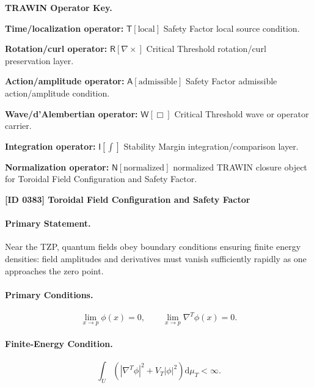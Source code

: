 \par\vspace{0.45\baselineskip}
\noindent\begin{minipage}[t]{\linewidth}
\begingroup
\small
\raggedright
\textbf{TRAWIN Operator Key.}\par
\noindent\textbf{Time/localization operator:} $\mathsf{T}\!\left[\mathrm{local}\right]$ Safety Factor local source condition.\par
\noindent\textbf{Rotation/curl operator:} $\mathsf{R}\!\left[\nabla\times\right]$ Critical Threshold rotation/curl preservation layer.\par
\noindent\textbf{Action/amplitude operator:} $\mathsf{A}\!\left[\mathrm{admissible}\right]$ Safety Factor admissible action/amplitude condition.\par
\noindent\textbf{Wave/d'Alembertian operator:} $\mathsf{W}\!\left[\Box\right]$ Critical Threshold wave or operator carrier.\par
\noindent\textbf{Integration operator:} $\mathsf{I}\!\left[\int\right]$ Stability Margin integration/comparison layer.\par
\noindent\textbf{Normalization operator:} $\mathsf{N}\!\left[\mathrm{normalized}\right]$ normalized TRAWIN closure object for Toroidal Field Configuration and Safety Factor.\par
\endgroup
\end{minipage}

\clearpage
\noindent\textbf{[ID 0383] Toroidal Field Configuration and Safety Factor}\par
\vspace{0.35em}
\paragraph{Primary Statement.}
Near the TZP, quantum fields obey boundary conditions ensuring finite energy densities: field amplitudes and derivatives must vanish sufficiently rapidly as one approaches the zero point.

\paragraph{Primary Conditions.}
\begin{equation}
\lim_{x\to p}\phi(x)=0,
\qquad
\lim_{x\to p}\nabla^T\phi(x)=0 .
\end{equation}

\paragraph{Finite-Energy Condition.}
\begin{equation}
\int_U
\left(
|\nabla^T\phi|^2
+
V_T|\phi|^2
\right)
\mathrm{d}\mu_T
<\infty .
\end{equation}

